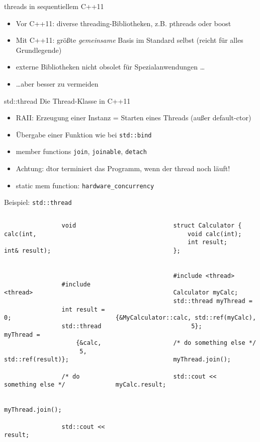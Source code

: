 \begin{frame}{threads in sequentiellem C++11}
	\begin{itemize}
		\item Vor C++11: diverse threading-Bibliotheken, z.B. pthreads oder boost
		\item Mit C++11: größte \emph{gemeinsame} Basis im Standard selbst (reicht für alles Grundlegende)
		\item externe Bibliotheken nicht obsolet für Spezialanwendungen \dots
		\item \dots aber besser zu vermeiden
	\end{itemize}
	
	\pause
	
	\begin{block}{std::thread}
		Die Thread-Klasse in C++11
		\begin{itemize}
			\item RAII: Erzeugung einer Instanz = Starten eines Threads (außer default-ctor)
			\item Übergabe einer Funktion wie bei \texttt{std::bind}
			\item member functions \texttt{join}, \texttt{joinable}, \texttt{detach}
			\item Achtung: dtor terminiert das Programm, wenn der thread noch läuft!
			\item static mem function: \texttt{hardware\_concurrency}
		\end{itemize}
	\end{block}
\end{frame}

\begin{frame}[fragile]{Beispiel: \texttt{std::thread}}
	\begin{columns}[b]
			\begin{lstlisting}
				void calc(int,
				          int& result);
				
				
				
				#include <thread>
				
				int result = 0;
				std::thread myThread =
					{&calc,
					 5, std::ref(result)};
					 
				/* do something else */
				
				myThread.join();
				
				std::cout << result;
			\end{lstlisting}
		
		\pause
		
			\begin{lstlisting}
				struct Calculator {
					void calc(int);
					int result;
				};
				
				
				#include <thread>
				
				Calculator myCalc;
				std::thread myThread =
					{&MyCalculator::calc, std::ref(myCalc),
					 5};
				
				/* do something else */
				
				myThread.join();
				
				std::cout << myCalc.result;
			\end{lstlisting}
	\end{columns}
\end{frame}

